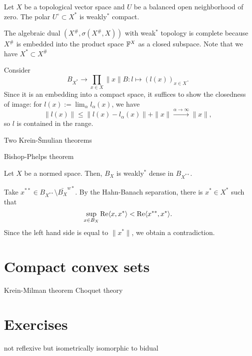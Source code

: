 \documentclass{../../large}
\begin{document}
\begin{prb}
Let $X$ be a topological vector space and $U$ be a balanced open neighborhood of zero.
The polar $U^\circ\subset X^*$ is weakly$^*$ compact.
\end{prb}
\begin{pf}
The algebraic dual $(X^\#,\sigma(X^\#,X))$ with weak$^*$ topology is complete because $X^\#$ is embedded into the product space $\mathbb{F}^X$ as a closed subspace.
Note that we have $X^*\subset X^\#$

Consider
\[B_{X^*}\to\prod_{x\in X}\|x\|B:l\mapsto(l(x))_{x\in X}.\]
Since it is an embedding into a compact space, it suffices to show the closedness of image: for $l(x):=\lim_\alpha l_\alpha(x)$, we have
\[\|l(x)\|\le\|l(x)-l_\alpha(x)\|+\|x\|\xrightarrow{\alpha\to\infty}\|x\|,\]
so $l$ is contained in the range.
\end{pf}
\begin{prb}
\end{prb}
\begin{prb}
\end{prb}






Two Krein-\v Smulian theorems




Bishop-Phelps theorem

\begin{prb}
Let $X$ be a normed space.
Then, $B_X$ is weakly$^*$ dense in $B_{X^{**}}$.
\end{prb}
\begin{pf}
Take $x^{**}\in B_{X^{**}}\setminus\bar{B_X}^{w*}$.
By the Hahn-Banach separation, there is $x^*\in X^*$ such that
\[\sup_{x\in B_X}\operatorname{Re}\langle x,x^*\rangle<\operatorname{Re}\langle x^{**},x^*\rangle.\]
Since the left hand side is equal to $\|x^*\|$, we obtain a contradiction.
\end{pf}


\section{Compact convex sets}
Krein-Milman theorem
Choquet theory




\section*{Exercises}
\begin{prb}
not reflexive but isometrically isomorphic to bidual
\end{prb}
\end{document}

